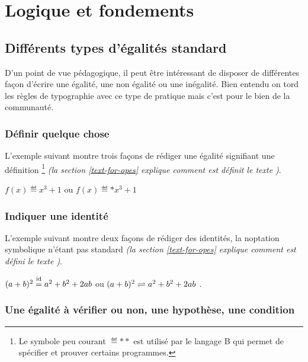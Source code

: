 \documentclass[12pt,a4paper]{article}
\theoremstyle{definition}
\begin{document}
\section{Logique et fondements}

\subsection{Différents types d'égalités \og standard \fg}

D'un point de vue pédagogique, il peut être intéressant de disposer de différentes façon d'écrire une égalité, une non égalité ou une inégalité.
Bien entendu on tord les règles de typographie avec ce type de pratique mais c'est pour le bien de la communauté.


\subsubsection{Définir quelque chose}

L'exemple suivant montre trois façons de rédiger une égalité signifiant une définition
\footnote{
	Le symbole peu courant $\eqdef**$ est utilisé par le langage B qui permet de spécifier et prouver certains programmes.
}
\emph{(la section \ref{text-for-opes} explique comment est définit le texte \emph{\og \textopdef \fg})}.

\begin{latexex}
$f(x) \eqdef x^3 + 1$ ou
$f(x) \eqdef* x^3 + 1$
\end{latexex}




\subsubsection{Indiquer une identité}

L'exemple suivant montre deux façons de rédiger des identités, la noptation symbolique n'étant pas standard \emph{(la section \ref{text-for-opes} explique comment est défini le texte \emph{\og \textopid \fg})}.

\begin{latexex}
$(a + b)^2 \eqid a^2 + b^2 + 2 a b$ ou
$(a + b)^2 \eqid* a^2 + b^2 + 2 a b$ .
\end{latexex}




\subsubsection{Une égalité à vérifier ou non, une hypothèse, une condition}
\end{document}
